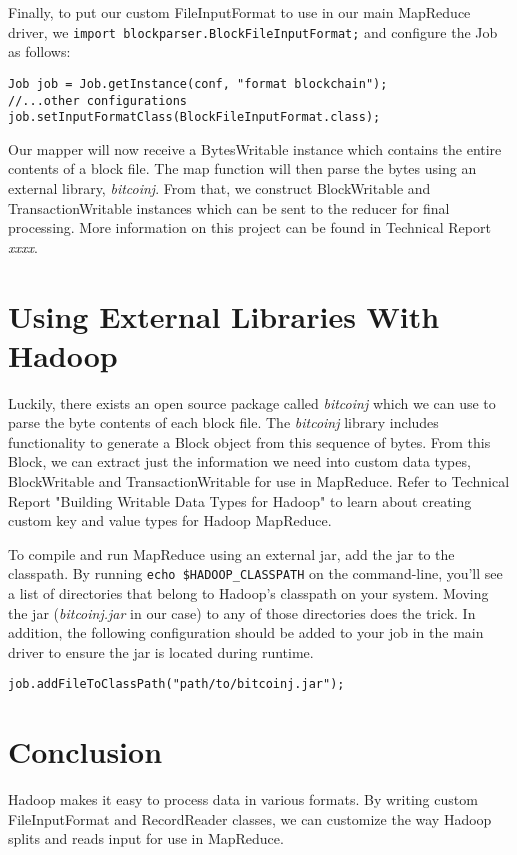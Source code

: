 \documentclass[9pt,twocolumn,twoside]{idsi}
\begin{document}
Finally, to put our custom FileInputFormat to use in our main MapReduce driver, we \lstinline{import blockparser.BlockFileInputFormat;} and configure the Job as follows:

\begin{lstlisting}
Job job = Job.getInstance(conf, "format blockchain");
//...other configurations
job.setInputFormatClass(BlockFileInputFormat.class);
\end{lstlisting}

Our mapper will now receive a BytesWritable instance which contains the entire contents of a block file. The map function will then parse the bytes using an external library, \emph{bitcoinj}. From that, we construct BlockWritable and TransactionWritable instances which can be sent to the reducer for final processing. More information on this project can be found in Technical Report \emph{xxxx}.

\section{Using External Libraries With Hadoop}

Luckily, there exists an open source package called \emph{bitcoinj} which we can use to parse the byte contents of each block file. The \emph{bitcoinj} library includes functionality to generate a Block object from this sequence of bytes. From this Block, we can extract just the information we need into custom data types, BlockWritable and TransactionWritable for use in MapReduce. Refer to Technical Report "Building Writable Data Types for Hadoop" to learn about creating custom key and value types for Hadoop MapReduce.

To compile and run MapReduce using an external jar, add the jar to the classpath. By running \lstinline{echo $HADOOP_CLASSPATH} on the command-line, you'll see a list of directories that belong to Hadoop's classpath on your system. Moving the jar (\emph{bitcoinj.jar} in our case) to any of those directories does the trick. In addition, the following configuration should be added to your job in the main driver to ensure the jar is located during runtime.

\begin{lstlisting}
job.addFileToClassPath("path/to/bitcoinj.jar");
\end{lstlisting}

\section{Conclusion}
Hadoop makes it easy to process data in various formats. By writing custom FileInputFormat and RecordReader classes, we can customize the way Hadoop splits and reads input for use in MapReduce.
\end{document}

